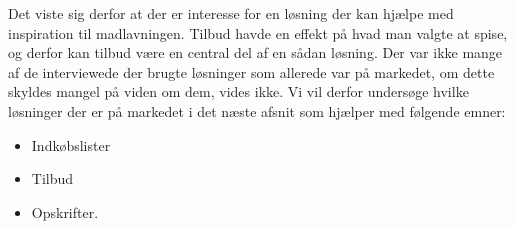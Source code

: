 Det viste sig derfor at der er interesse for en løsning der kan hjælpe med inspiration til madlavningen. 
Tilbud havde en effekt på hvad man valgte at spise, og derfor kan tilbud være en central del af en sådan løsning.
Der var ikke mange af de interviewede der brugte løsninger som allerede var på markedet, om dette skyldes mangel på viden om dem, vides ikke.
Vi vil derfor undersøge hvilke løsninger der er på markedet i det næste afsnit som hjælper med følgende emner:


\begin{itemize}
	\item Indkøbslister
	\item Tilbud
	\item Opskrifter.
\end{itemize}
